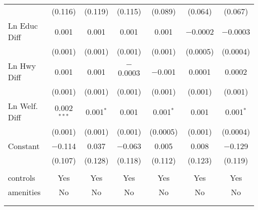 \begin{table}[!htbp]
\begin{tabular}{@{\extracolsep{5pt}}lcccccc}
  & (0.116) & (0.119) & (0.115) & (0.089) & (0.064) & (0.067) \\ 
  Ln Educ Diff & 0.001 & 0.001 & 0.001 & 0.001 & $-$0.0002 & $-$0.0003 \\ 
  & (0.001) & (0.001) & (0.001) & (0.001) & (0.0005) & (0.0004) \\ 
  Ln Hwy Diff & 0.001 & 0.001 & $-$0.0003 & $-$0.001 & 0.0001 & 0.0002 \\ 
  & (0.001) & (0.001) & (0.001) & (0.001) & (0.001) & (0.001) \\ 
  Ln Welf. Diff & 0.002$^{***}$ & 0.001$^{*}$ & 0.001 & 0.001$^{*}$ & 0.001 & 0.001$^{*}$ \\ 
  & (0.001) & (0.001) & (0.001) & (0.0005) & (0.001) & (0.0004) \\ 
  Constant & $-$0.114 & 0.037 & $-$0.063 & 0.005 & 0.008 & $-$0.129 \\ 
  & (0.107) & (0.128) & (0.118) & (0.112) & (0.123) & (0.119) \\ 
 \hline \\[-1.8ex] 
controls & Yes & Yes & Yes & Yes & Yes & Yes \\ 
amenities & No & No & No & No & No & No \\ 
\hline \\[-1.8ex] 
\hline 
\hline \\[-1.8ex] 
\end{tabular} 
\end{table} 
